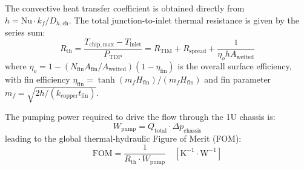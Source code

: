 The convective heat transfer coefficient is obtained directly from $h = \mathrm{Nu} \cdot k_f / D_{h,\mathrm{ch}}$. The total junction-to-inlet thermal resistance is given by the series sum:
\begin{equation}
R_{\mathrm{th}} = \frac{T_{\mathrm{chip,max}} - T_{\mathrm{inlet}}}{P_{\mathrm{TDP}}} = R_{\mathrm{TIM}} + R_{\mathrm{spread}} + \frac{1}{\eta_o h A_{\mathrm{wetted}}}
\label{eq:rth_sum}
\end{equation}
where $\eta_o = 1 - (N_{\mathrm{fin}} A_{\mathrm{fin}} / A_{\mathrm{wetted}})(1 - \eta_{\mathrm{fin}})$ is the overall surface efficiency, with fin efficiency $\eta_{\mathrm{fin}} = \tanh(m_f H_{\mathrm{fin}}) / (m_f H_{\mathrm{fin}})$ and fin parameter $m_f = \sqrt{2 h / (k_{\mathrm{copper}} t_{\mathrm{fin}})}$.

The pumping power required to drive the flow through the 1U chassis is:
\begin{equation}
W_{\mathrm{pump}} = Q_{\mathrm{total}} \cdot \Delta p_{\mathrm{chassis}}
\label{eq:wpump}
\end{equation}
leading to the global thermal-hydraulic Figure of Merit (FOM):
\begin{equation}
\mathrm{FOM} = \frac{1}{R_{\mathrm{th}} \cdot W_{\mathrm{pump}}} \quad [\mathrm{K}^{-1} \cdot \mathrm{W}^{-1}]
\label{eq:fom}
\end{equation}

